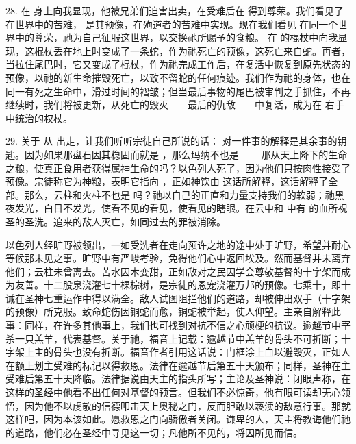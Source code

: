28.  在  身上向我显现，他被兄弟们迫害出卖，在受难后在  得到尊荣。我们看见了  在世界中的苦难， 是其预像，在殉道者的苦难中实现。现在我们看见  在同一个世界中的尊荣，祂为自己征服这世界，以交换祂所赐予的食粮。 在  的棍杖中向我显现，这棍杖丢在地上时变成了一条蛇，作为祂死亡的预像，这死亡来自蛇。再者，当拉住尾巴时，它又变成了棍杖，作为祂完成工作后，在复活中恢复到原先状态的预像，以祂的新生命摧毁死亡，以致不留蛇的任何痕迹。我们作为祂的身体，也在同一有死之生命中，滑过时间的褶皱；但当最后事物的尾巴被审判之手抓住，不再继续时，我们将被更新，从死亡的毁灭——最后的仇敌——中复活，成为在  右手中统治的权杖。\par

29. 关于  从  出走，让我们听听宗徒自己所说的话： 对一件事的解释是其余事的钥匙。因为如果那盘石因其稳固而就是 ，那么玛纳不也是 ——那从天上降下的生命之粮，使真正食用者获得属神生命的吗？以色列人死了，因为他们只按肉性接受了预像。宗徒称它为神粮，表明它指向 ，正如神饮由  这话所解释，这话解释了全部。那么，云柱和火柱不也是  吗？祂以自己的正直和力量支持我们的软弱；祂黑夜发光，白日不发光，使看不见的看见，使看见的瞎眼。在云中和  中有  的血所祝圣的圣洗。追来的敌人灭亡，如同过去的罪被消除。\par

以色列人经旷野被领出，一如受洗者在走向预许之地的途中处于旷野，希望并耐心等候那未见之事。旷野中有严峻考验，免得他们心中返回埃及。然而基督并未离弃他们；云柱未曾离去。苦水因木变甜，正如敌对之民因学会尊敬基督的十字架而成为友善。十二股泉浇灌七十棵棕树，是宗徒的恩宠浇灌万邦的预像。七乘十，即十诫在圣神七重运作中得以满全。敌人试图阻拦他们的道路，却被伸出双手（十字架的预像）所克服。致命蛇伤因铜蛇而愈，铜蛇被举起，使人仰望。主亲自解释此事：同样，在许多其他事上，我们也可找到对抗不信之心顽梗的抗议。逾越节中宰杀一只羔羊，代表基督。关于祂，福音上记载：逾越节中羔羊的骨头不可折断；十字架上主的骨头也没有折断。福音作者引用这话说：门框涂上血以避毁灭，正如人在额上划主受难的标记以得救恩。法律在逾越节后第五十天颁布；同样，圣神在主受难后第五十天降临。法律据说由天主的指头所写；主论及圣神说：闭眼声称，在这样的圣经中他看不出任何对基督的预言。但我们不必惊奇，他有眼可读却无心领悟，因为他不以虔敬的信德叩击天上奥秘之门，反而胆敢以亵渎的敌意行事。那就这样吧，因为本该如此。愿救恩之门向骄傲者关闭。谦卑的人，天主将教诲他们祂的道路，他们必在圣经中寻见这一切；凡他所不见的，将因所见而信。\par

